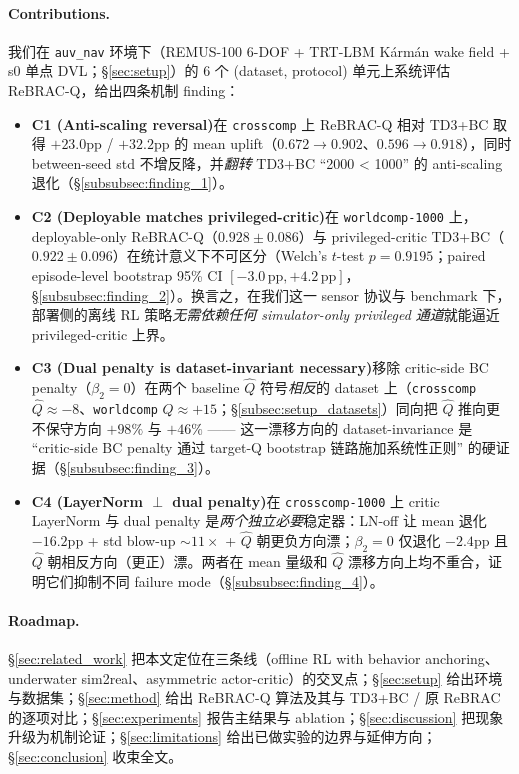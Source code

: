 \paragraph{Contributions.}
我们在 \texttt{auv\_nav} 环境下（REMUS-100 6-DOF + TRT-LBM Kármán wake field + s0 单点 DVL；\S\ref{sec:setup}）的 6 个 (dataset, protocol) 单元上系统评估 ReBRAC-Q，给出四条机制 finding：

\begin{itemize}
    \item \textbf{C1 (Anti-scaling reversal)}\quad 在 \texttt{crosscomp} 上 ReBRAC-Q 相对 TD3+BC 取得 $+23.0$pp / $+32.2$pp 的 mean uplift（$0.672 \to 0.902$、$0.596 \to 0.918$），同时 between-seed std 不增反降，并\emph{翻转} TD3+BC ``2000 < 1000'' 的 anti-scaling 退化（\S\ref{subsubsec:finding_1}）。

    \item \textbf{C2 (Deployable matches privileged-critic)}\quad 在 \texttt{worldcomp-1000} 上，deployable-only ReBRAC-Q（$0.928 \pm 0.086$）与 privileged-critic TD3+BC（$0.922 \pm 0.096$）在统计意义下不可区分（Welch's $t$-test $p = 0.9195$；paired episode-level bootstrap 95\% CI $[-3.0\,\mathrm{pp}, +4.2\,\mathrm{pp}]$，\S\ref{subsubsec:finding_2}）。换言之，在我们这一 sensor 协议与 benchmark 下，部署侧的离线 RL 策略\emph{无需依赖任何 simulator-only privileged 通道}就能逼近 privileged-critic 上界。

    \item \textbf{C3 (Dual penalty is dataset-invariant necessary)}\quad 移除 critic-side BC penalty（$\beta_2 = 0$）在两个 baseline $\hat{Q}$ 符号\emph{相反}的 dataset 上（\texttt{crosscomp} $\hat{Q} \approx -8$、\texttt{worldcomp} $\hat{Q} \approx +15$；\S\ref{subsec:setup_datasets}）同向把 $\hat{Q}$ 推向更不保守方向 $+98\%$ 与 $+46\%$ —— 这一漂移方向的 dataset-invariance 是 ``critic-side BC penalty 通过 target-Q bootstrap 链路施加系统性正则'' 的硬证据（\S\ref{subsubsec:finding_3}）。

    \item \textbf{C4 (LayerNorm $\perp$ dual penalty)}\quad 在 \texttt{crosscomp-1000} 上 critic LayerNorm 与 dual penalty 是\emph{两个独立必要}稳定器：LN-off 让 mean 退化 $-16.2$pp + std blow-up $\sim 11\times$ + $\hat{Q}$ 朝更负方向漂；$\beta_2 = 0$ 仅退化 $-2.4$pp 且 $\hat{Q}$ 朝相反方向（更正）漂。两者在 mean 量级和 $\hat{Q}$ 漂移方向上均不重合，证明它们抑制不同 failure mode（\S\ref{subsubsec:finding_4}）。
\end{itemize}

\paragraph{Roadmap.}
\S\ref{sec:related_work} 把本文定位在三条线（offline RL with behavior anchoring、underwater sim2real、asymmetric actor-critic）的交叉点；\S\ref{sec:setup} 给出环境与数据集；\S\ref{sec:method} 给出 ReBRAC-Q 算法及其与 TD3+BC / 原 ReBRAC 的逐项对比；\S\ref{sec:experiments} 报告主结果与 ablation；\S\ref{sec:discussion} 把现象升级为机制论证；\S\ref{sec:limitations} 给出已做实验的边界与延伸方向；\S\ref{sec:conclusion} 收束全文。
